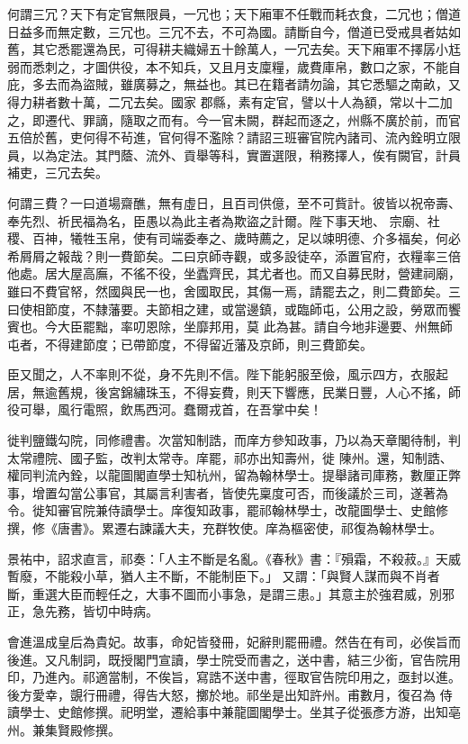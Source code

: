 \begin{pinyinscope}
 何謂三冗？天下有定官無限員，一冗也；天下廂軍不任戰而耗衣食，二冗也；僧道日益多而無定數，三冗也。三冗不去，不可為國。請斷自今，僧道已受戒具者姑如舊，其它悉罷還為民，可得耕夫織婦五十餘萬人，一冗去矣。天下廂軍不擇孱小尪弱而悉刺之，才圖供役，本不知兵，又且月支廩糧，歲費庫帛，數口之家，不能自庇，多去而為盜賊，雖廣募之，無益也。其已在籍者請勿論，其它悉驅之南畝，又得力耕者數十萬，二冗去矣。國家
 郡縣，素有定官，譬以十人為額，常以十二加之，即遷代、罪謫，隨取之而有。今一官未闕，群起而逐之，州縣不廣於前，而官五倍於舊，吏何得不茍進，官何得不濫除？請詔三班審官院內諸司、流內銓明立限員，以為定法。其門蔭、流外、貢舉等科，實置選限，稍務擇人，俟有闕官，計員補吏，三冗去矣。



 何謂三費？一曰道場齋醮，無有虛日，且百司供億，至不可貲計。彼皆以祝帝壽、奉先烈、祈民福為名，臣愚以為此主者為欺盜之計爾。陛下事天地、
 宗廟、社稷、百神，犧牲玉帛，使有司端委奉之、歲時薦之，足以竦明德、介多福矣，何必希屑屑之報哉？則一費節矣。二曰京師寺觀，或多設徒卒，添置官府，衣糧率三倍他處。居大屋高廡，不徭不役，坐蠹齊民，其尤者也。而又自募民財，營建祠廟，雖曰不費官帑，然國與民一也，舍國取民，其傷一焉，請罷去之，則二費節矣。三曰使相節度，不隸藩要。夫節相之建，或當邊鎮，或臨師屯，公用之設，勞眾而饗賓也。今大臣罷黜，率叨恩除，坐靡邦用，莫
 此為甚。請自今地非邊要、州無師屯者，不得建節度；已帶節度，不得留近藩及京師，則三費節矣。



 臣又聞之，人不率則不從，身不先則不信。陛下能躬服至儉，風示四方，衣服起居，無逾舊規，後宮錦繡珠玉，不得妄費，則天下響應，民業日豐，人心不搖，師役可舉，風行電照，飲馬西河。蠢爾戎首，在吾掌中矣！



 徙判鹽鐵勾院，同修禮書。次當知制誥，而庠方參知政事，乃以為天章閣待制，判太常禮院、國子監，改判太常寺。庠罷，祁亦出知壽州，徙
 陳州。還，知制誥、權同判流內銓，以龍圖閣直學士知杭州，留為翰林學士。提舉諸司庫務，數厘正弊事，增置勾當公事官，其屬言利害者，皆使先稟度可否，而後議於三司，遂著為令。徙知審官院兼侍讀學士。庠復知政事，罷祁翰林學士，改龍圖學士、史館修撰，修《唐書》。累遷右諫議大夫，充群牧使。庠為樞密使，祁復為翰林學士。



 景祐中，詔求直言，祁奏：「人主不斷是名亂。《春秋》書：『殞霜，不殺菽。』天威暫廢，不能殺小草，猶人主不斷，不能制臣下。」
 又謂：「與賢人謀而與不肖者斷，重選大臣而輕任之，大事不圖而小事急，是謂三患。」其意主於強君威，別邪正，急先務，皆切中時病。



 會進溫成皇后為貴妃。故事，命妃皆發冊，妃辭則罷冊禮。然告在有司，必俟旨而後進。又凡制詞，既授閣門宣讀，學士院受而書之，送中書，結三少銜，官告院用印，乃進內。祁適當制，不俟旨，寫誥不送中書，徑取官告院印用之，亟封以進。後方愛幸，覬行冊禮，得告大怒，擲於地。祁坐是出知許州。甫數月，復召為
 侍讀學士、史館修撰。祀明堂，遷給事中兼龍圖閣學士。坐其子從張彥方游，出知亳州。兼集賢殿修撰。




\end{pinyinscope}
